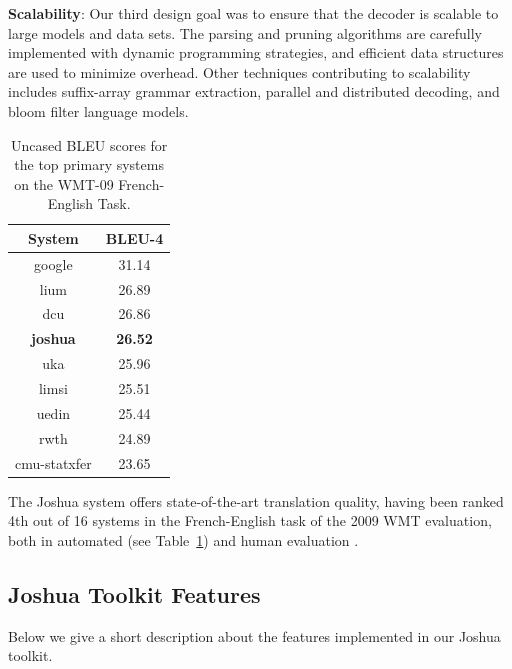 \documentclass[11pt]{article}
\begin{document}
\textbf{Scalability}: Our third design goal was to ensure that the decoder is scalable
to large models and data sets. The parsing and pruning algorithms are carefully
implemented with dynamic programming strategies, and efficient data structures are
used to minimize overhead. Other techniques contributing to scalability includes
suffix-array grammar extraction, parallel and distributed decoding, and bloom filter
language models.

\begin{table}[t]
\begin{center}
\begin{tabular}{c c}\hline
  System & B{\small LEU}-4 \\ \hline
  google & 31.14 \\
  lium & 26.89 \\
  dcu & 26.86 \\
  {\bf joshua} & {\bf 26.52} \\
  uka & 25.96 \\
  limsi & 25.51 \\
  uedin & 25.44 \\
  rwth & 24.89 \\
  cmu-statxfer & 23.65 \\ \hline
\end{tabular}
\end{center}
\caption{Uncased B{\small LEU} scores for the top primary systems on the WMT-09 French-English Task.}
\label{results-wmt09}
\end{table}

The Joshua system offers state-of-the-art translation quality, having been
ranked 4th out of 16 systems in the French-English task of the 2009 WMT
evaluation, both in automated (see Table~\ref{results-wmt09}) and human
evaluation \cite{WMT09-Findings}.

\subsection{Joshua Toolkit Features}

Below we give a short description about the features implemented in our Joshua toolkit.
\end{document}
